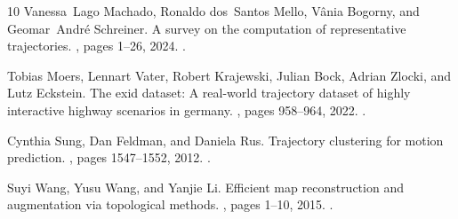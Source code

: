 \documentclass[11pt]{article}
\begin{document}
\begin{thebibliography}{10}
Vanessa~Lago Machado, Ronaldo dos~Santos Mello, V{\^a}nia Bogorny, and
  Geomar~Andr{\'e} Schreiner.
\newblock A survey on the computation of representative trajectories.
, pages 1--26, 2024.
\newblock \href {https://doi.org/10.1007/s10707-024-00514-y}
  {}.

Tobias Moers, Lennart Vater, Robert Krajewski, Julian Bock, Adrian Zlocki, and
  Lutz Eckstein.
\newblock The exid dataset: A real-world trajectory dataset of highly
  interactive highway scenarios in germany.
, pages 958--964,
  2022.
\newblock \href {https://doi.org/10.1109/IV51971.2022.9827305}
  {}.

Cynthia Sung, Dan Feldman, and Daniela Rus.
\newblock Trajectory clustering for motion prediction.
, pages 1547--1552, 2012.
\newblock \href {https://doi.org/10.1109/IROS.2012.6386017}
  {}.

Suyi Wang, Yusu Wang, and Yanjie Li.
\newblock Efficient map reconstruction and augmentation via topological
  methods.
, pages 1--10, 2015.
\newblock \href {https://doi.org/10.1145/2820783.2820833}
  {}.

\end{thebibliography}
\end{document}
